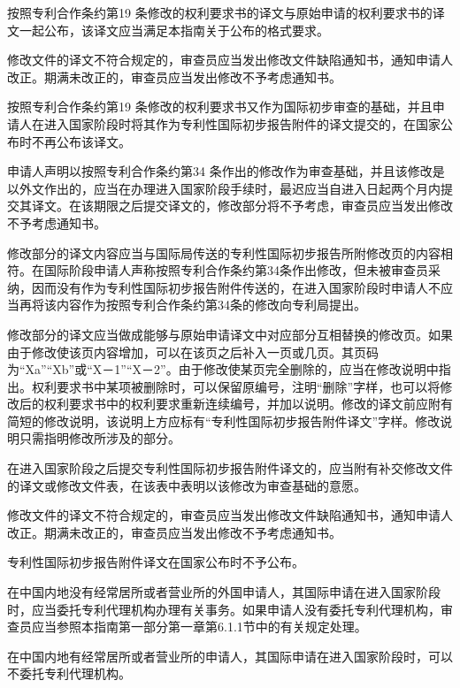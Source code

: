 按照专利合作条约第19 条修改的权利要求书的译文与原始申请的权利要求书的译文一起公布，该译文应当满足本指南关于公布的格式要求。

修改文件的译文不符合规定的，审查员应当发出修改文件缺陷通知书，通知申请人改正。期满未改正的，审查员应当发出修改不予考虑通知书。

按照专利合作条约第19 条修改的权利要求书又作为国际初步审查的基础，并且申请人在进入国家阶段时将其作为专利性国际初步报告附件的译文提交的，在国家公布时不再公布该译文。

申请人声明以按照专利合作条约第34 条作出的修改作为审查基础，并且该修改是以外文作出的，应当在办理进入国家阶段手续时，最迟应当自进入日起两个月内提交其译文。在该期限之后提交译文的，修改部分将不予考虑，审查员应当发出修改不予考虑通知书。

修改部分的译文内容应当与国际局传送的专利性国际初步报告所附修改页的内容相符。在国际阶段申请人声称按照专利合作条约第34条作出修改，但未被审查员采纳，因而没有作为专利性国际初步报告附件传送的，在进入国家阶段时申请人不应当再将该内容作为按照专利合作条约第34条的修改向专利局提出。

修改部分的译文应当做成能够与原始申请译文中对应部分互相替换的修改页。如果由于修改使该页内容增加，可以在该页之后补入一页或几页。其页码为“Xa”“Xb”或“X－1”“X－2”。由于修改使某页完全删除的，应当在修改说明中指出。权利要求书中某项被删除时，可以保留原编号，注明“删除”字样，也可以将修改后的权利要求书中的权利要求重新连续编号，并加以说明。修改的译文前应附有简短的修改说明，该说明上方应标有“专利性国际初步报告附件译文”字样。修改说明只需指明修改所涉及的部分。

在进入国家阶段之后提交专利性国际初步报告附件译文的，应当附有补交修改文件的译文或修改文件表，在该表中表明以该修改为审查基础的意愿。

修改文件的译文不符合规定的，审查员应当发出修改文件缺陷通知书，通知申请人改正。期满未改正的，审查员应当发出修改不予考虑通知书。

专利性国际初步报告附件译文在国家公布时不予公布。

在中国内地没有经常居所或者营业所的外国申请人，其国际申请在进入国家阶段时，应当委托专利代理机构办理有关事务。如果申请人没有委托专利代理机构，审查员应当参照本指南第一部分第一章第6.1.1节中的有关规定处理。

在中国内地有经常居所或者营业所的申请人，其国际申请在进入国家阶段时，可以不委托专利代理机构。

